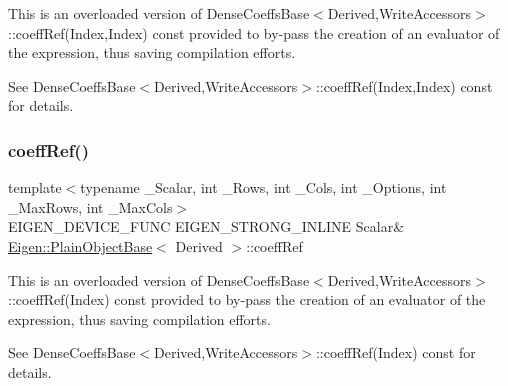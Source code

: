 This is an overloaded version of Dense\+Coeffs\+Base$<$\+Derived,\+Write\+Accessors$>$\+::coeff\+Ref(\+Index,\+Index) const provided to by-\/pass the creation of an evaluator of the expression, thus saving compilation efforts.

See Dense\+Coeffs\+Base$<$\+Derived,\+Write\+Accessors$>$\+::coeff\+Ref(\+Index,\+Index) const for details. \mbox{\label{class_eigen_1_1_matrix_a571632ed666076d7403c8bd3eece44f0}} 
\subsubsection{\texorpdfstring{coeffRef()}{coeffRef()}\hspace{0.1cm}{\footnotesize\ttfamily [2/4]}}
{\footnotesize\ttfamily template$<$typename \+\_\+\+Scalar, int \+\_\+\+Rows, int \+\_\+\+Cols, int \+\_\+\+Options, int \+\_\+\+Max\+Rows, int \+\_\+\+Max\+Cols$>$ \\
E\+I\+G\+E\+N\+\_\+\+D\+E\+V\+I\+C\+E\+\_\+\+F\+U\+NC E\+I\+G\+E\+N\+\_\+\+S\+T\+R\+O\+N\+G\+\_\+\+I\+N\+L\+I\+NE Scalar\& \mbox{\hyperlink{class_eigen_1_1_plain_object_base}{Eigen\+::\+Plain\+Object\+Base}}$<$ Derived $>$\+::coeff\+Ref\hspace{0.3cm}{\ttfamily [inline]}}

This is an overloaded version of Dense\+Coeffs\+Base$<$\+Derived,\+Write\+Accessors$>$\+::coeff\+Ref(\+Index) const provided to by-\/pass the creation of an evaluator of the expression, thus saving compilation efforts.

See Dense\+Coeffs\+Base$<$\+Derived,\+Write\+Accessors$>$\+::coeff\+Ref(\+Index) const for details. \mbox{\label{class_eigen_1_1_matrix_ab1b33ee10e4c72ec5cf354d511900e62}} 
